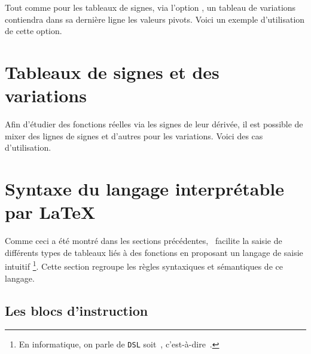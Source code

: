 \documentclass[10pt, a4paper]{article}
\newcommand\thispack{\tdocpack{tns-functab}}
\begin{document}
Tout comme pour les tableaux de signes, via l'option , un tableau de variations contiendra dans sa dernière ligne les valeurs pivots. Voici un exemple d'utilisation de cette option.


\section{Tableaux de signes et des variations}

Afin d'étudier des fonctions réelles via les signes de leur dérivée, il est possible de mixer des lignes de signes et d'autres pour les variations. Voici des cas d'utilisation.


\section{Syntaxe du langage interprétable par \LaTeX}
\label{tns-math-functab-dsl-l3}

Comme ceci a été montré dans les sections précédentes, \thispack\ facilite la saisie de différents types de tableaux liés à des fonctions en proposant un langage de saisie intuitif
\footnote{
    En informatique, on parle de \texttt{DSL} soit \,, c'est-à-dire \,.
}.
Cette section regroupe les règles syntaxiques et sémantiques de ce langage.



\subsection{Les blocs d'instruction}
\end{document}
